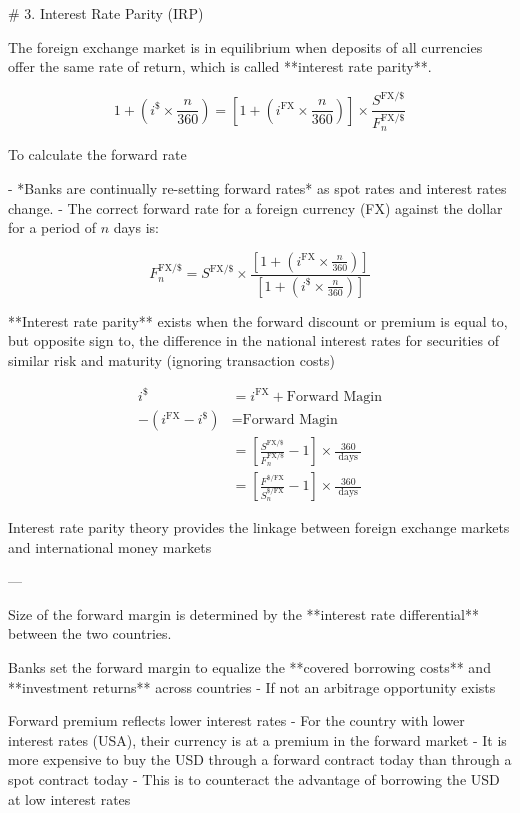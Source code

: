 # 3. Interest Rate Parity (IRP)

The foreign exchange market is in equilibrium when deposits of all currencies offer the same rate of return, which is called **interest rate parity**.

$$
1+\left(i^{\$} \times \frac{n}{360}\right) = \left[1+\left(i^{\text{FX}} \times \frac{n}{360}\right)\right] \times \frac{S^{\text{FX/\$}}}{F_{n}^{\text{FX/\$}}}
$$

To calculate the forward rate

- *Banks are continually re-setting forward rates* as spot rates and interest rates change.
- The correct forward rate for a foreign currency (FX) against the dollar for a period of $ n $ days is:

$$
F_{n}^{\text{FX/\$}}=S^{\text{FX/\$}} \times \frac{\left[1+\left(i^{\text{FX}} \times \frac{n}{360}\right)\right]}{\left[1+\left(i^{\$} \times \frac{n}{360}\right)\right]}
$$

**Interest rate parity** exists when the forward discount or premium is equal to, but opposite sign to, the difference in the national interest rates for securities of similar risk and maturity (ignoring transaction costs)

$$
\begin{aligned}
i^{\$} &= i^{\text{FX}} + \text{Forward Magin}
\\
-(i^{\text{FX}} - i^{\$}) & =   \text{Forward Magin} 
\\
&=  \left[\frac{S^{\text{FX/\$}}}{F_{n}^{\text{FX/\$}}}-1 \right] \times \frac{360}{\text { days }} \\
&=  \left[\frac{F^{\text{\$/FX}}}{S_{n}^{\text{\$/FX}}}-1 \right] \times \frac{360}{\text { days }}
\end{aligned}
$$


Interest rate parity theory provides the linkage between foreign exchange markets and international money markets

---

Size of the forward margin is determined by the **interest rate differential** between the two countries.

Banks set the forward margin to equalize the **covered borrowing costs** and **investment returns** across countries
- If not an arbitrage opportunity exists


Forward premium reflects lower interest rates
- For the country with lower interest rates (USA), their currency is at a premium in the forward market
- It is more expensive to buy the USD through a forward contract today than through a spot contract today
- This is to counteract the advantage of borrowing the USD at low interest rates


